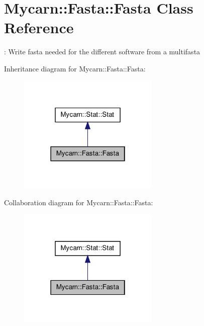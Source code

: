 \hypertarget{classMycarn_1_1Fasta_1_1Fasta}{
\section{\-Mycarn\-:\-:\-Fasta\-:\-:\-Fasta \-Class \-Reference}
\label{classMycarn_1_1Fasta_1_1Fasta}
}


\-: \-Write fasta needed for the different software from a multifasta  




\-Inheritance diagram for \-Mycarn\-:\-:\-Fasta\-:\-:\-Fasta\-:
\nopagebreak
\begin{figure}[H]
\begin{center}
\leavevmode
\includegraphics[width=190pt]{classMycarn_1_1Fasta_1_1Fasta__inherit__graph}
\end{center}
\end{figure}


\-Collaboration diagram for \-Mycarn\-:\-:\-Fasta\-:\-:\-Fasta\-:
\nopagebreak
\begin{figure}[H]
\begin{center}
\leavevmode
\includegraphics[width=190pt]{classMycarn_1_1Fasta_1_1Fasta__coll__graph}
\end{center}
\end{figure}
